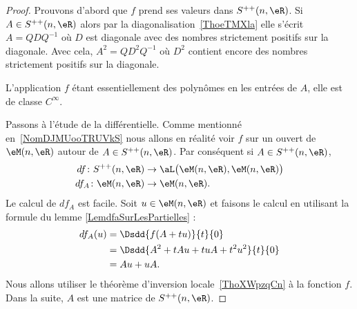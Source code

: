 \begin{proof}
    Prouvons d'abord que \( f\) prend ses valeurs dans \( S^{++}(n,\eR)\). Si \( A\in S^{++}(n,\eR)\) alors par la diagonalisation~\ref{ThoeTMXla} elle s'écrit \( A=QDQ^{-1}\) où \( D\) est diagonale avec des nombres strictement positifs sur la diagonale. Avec cela, \( A^2=QD^2Q^{-1}\) où \( D^2\) contient encore des nombres strictement positifs sur la diagonale.

    L'application \( f\) étant essentiellement des polynômes en les entrées de \( A\), elle est de classe \( C^{\infty}\).

    Passons à l'étude de la différentielle. Comme mentionné en~\ref{NomDJMUooTRUVkS} nous allons en réalité voir \( f\) sur un ouvert de \( \eM(n,\eR)\) autour de \( A\in S^{++}(n,\eR)\). Par conséquent si \( A\in S^{++}(n,\eR)\),
    \begin{subequations}
        \begin{align}
            df\colon S^{++}(n,\eR)  & \to \aL\big( \eM(n,\eR),\eM(n,\eR) \big)    \\
            df_A\colon \eM(n,\eR)   & \to \eM(n,\eR).
        \end{align}
    \end{subequations}
    Le calcul de \( df_A\) est facile. Soit \( u\in \eM(n,\eR)\) et faisons le calcul en utilisant la formule du lemme \eqref{LemdfaSurLesPartielles} :
    \begin{subequations}
        \begin{align}
            df_A(u) & = \Dsdd{ f(A+tu) }{t}{0}              \\
                    & = \Dsdd{ A^2+tAu+tuA+t^2u^2 }{t}{0}   \\
                    & = Au+uA.
        \end{align}
    \end{subequations}
    Nous allons utiliser le théorème d'inversion locale~\ref{ThoXWpzqCn} à la fonction \( f\). Dans la suite, \( A\) est une matrice de \( S^{++}(n,\eR)\).


\end{proof}
